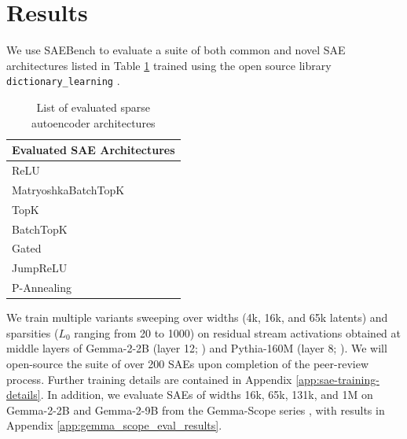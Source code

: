 \documentclass{article}
\theoremstyle{plain}
\theoremstyle{definition}
\theoremstyle{remark}
\begin{document}
\section{Results}

We use SAEBench to evaluate a suite of both common and novel SAE architectures listed in Table \ref{tab:sae_types} trained using the open source library \texttt{dictionary\_learning} \cite{marks2024dictionary_learning}.

\begin{table}[h!]
\centering
\begin{tabular}{|l|}
\hline
\textbf{Evaluated SAE Architectures}                                                         \\ \hline
ReLU                         \cite{anthropic_sae_2024}                                                   \\ \hline
MatryoshkaBatchTopK          \cite{bussmann2024matryoshka}                                               \\ \hline
TopK                         \cite{gao2024scaling}                                                      \\ \hline
BatchTopK                    \cite{bussmann2024batchtopk}                                               \\ \hline
Gated                        \cite{rajamanoharan2024improving}                                          \\ \hline
JumpReLU                     \cite{rajamanoharan2024jumping}                                            \\ \hline
P-Annealing                  \cite{karvonen2024measuringprogressdictionarylearning}                     \\ \hline
\end{tabular}
\caption{List of evaluated sparse autoencoder architectures}
\label{tab:sae_types}
\end{table}

We train multiple variants sweeping over widths (4k, 16k, and 65k latents) and sparsities ($L_0$ ranging from 20 to 1000) on residual stream activations obtained at middle layers of Gemma-2-2B (layer 12; \citet{gemmateam2024gemma2improvingopen}) and Pythia-160M (layer 8; \citet{biderman2023pythiasuiteanalyzinglarge}). We will open-source the suite of over 200 SAEs upon completion of the peer-review process. Further training details are contained in Appendix \ref{app:sae-training-details}. In addition, we evaluate SAEs of widths 16k, 65k, 131k, and 1M on Gemma-2-2B and Gemma-2-9B from the Gemma-Scope series \cite{lieberum2024gemmascopeopensparse}, with results in Appendix \ref{app:gemma_scope_eval_results}.
\end{document}
